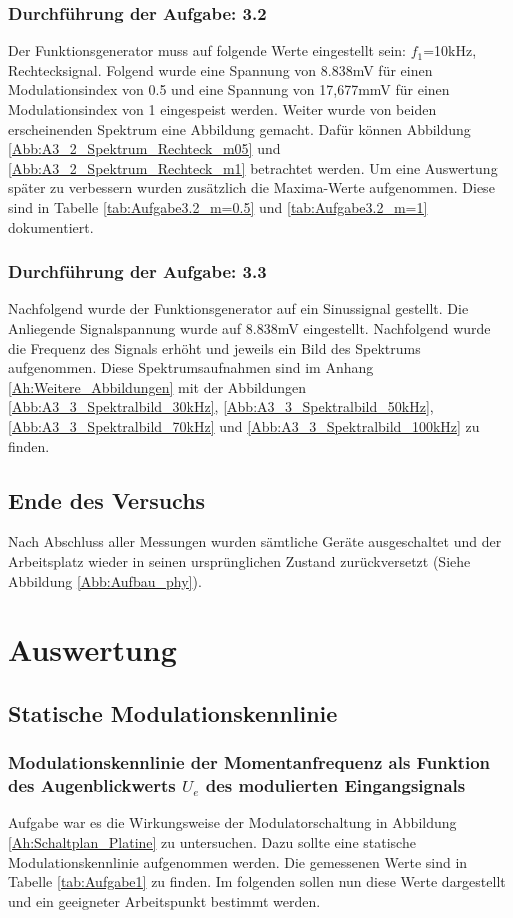 \documentclass[12pt]{scrartcl}
\begin{document}
\subsubsection*{Durchführung der Aufgabe: 3.2}
Der Funktionsgenerator muss auf folgende Werte eingestellt sein: $f_1$=10kHz, Rechtecksignal. 
Folgend wurde eine Spannung von 8.838mV für einen Modulationsindex von 0.5 und eine Spannung von 17,677mmV für einen Modulationsindex von 1 eingespeist werden. 
Weiter wurde von beiden erscheinenden Spektrum eine Abbildung gemacht.
Dafür können Abbildung \ref{Abb:A3_2_Spektrum_Rechteck_m05} und \ref{Abb:A3_2_Spektrum_Rechteck_m1} betrachtet werden. 
Um eine Auswertung später zu verbessern wurden zusätzlich die Maxima-Werte aufgenommen. 
Diese sind in Tabelle \ref{tab:Aufgabe3.2_m=0.5} und \ref{tab:Aufgabe3.2_m=1} dokumentiert.

\subsubsection*{Durchführung der Aufgabe: 3.3}
Nachfolgend wurde der Funktionsgenerator auf ein Sinussignal gestellt. 
Die Anliegende Signalspannung wurde auf 8.838mV eingestellt. 
Nachfolgend wurde die Frequenz des Signals erhöht und jeweils ein Bild des Spektrums aufgenommen. 
Diese Spektrumsaufnahmen sind im Anhang \ref{Ah:Weitere_Abbildungen} mit der Abbildungen \ref{Abb:A3_3_Spektralbild_30kHz}, \ref{Abb:A3_3_Spektralbild_50kHz}, \ref{Abb:A3_3_Spektralbild_70kHz} und \ref{Abb:A3_3_Spektralbild_100kHz} zu finden.

\subsection{Ende des Versuchs}
Nach Abschluss aller Messungen wurden sämtliche Geräte ausgeschaltet und der Arbeitsplatz wieder in seinen ursprünglichen Zustand zurückversetzt (Siehe Abbildung \ref{Abb:Aufbau_phy}).


\newpage
\section{Auswertung}
\subsection{Statische Modulationskennlinie}
\label{kap:1}
\subsubsection{Modulationskennlinie der Momentanfrequenz als Funktion des Augenblickwerts $U_e$ des modulierten Eingangsignals}
\label{kap:1.1}
Aufgabe war es die Wirkungsweise der Modulatorschaltung in Abbildung \ref{Ah:Schaltplan_Platine} zu untersuchen. 
Dazu sollte eine statische Modulationskennlinie aufgenommen werden. Die gemessenen Werte sind in Tabelle \ref{tab:Aufgabe1} zu finden. 
Im folgenden sollen nun diese Werte dargestellt und ein geeigneter Arbeitspunkt bestimmt werden. 
\end{document}
